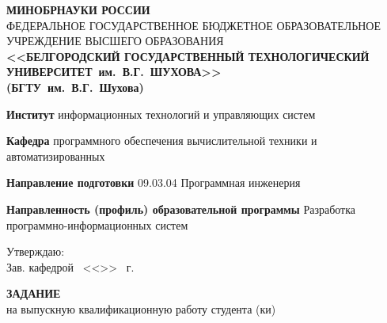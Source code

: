 \documentclass[14pt]{extarticle}
\begin{document}
\begin{center}
	\small
	\textbf{МИНОБРНАУКИ РОССИИ} \\[0.5em]
	ФЕДЕРАЛЬНОЕ ГОСУДАРСТВЕННОЕ БЮДЖЕТНОЕ ОБРАЗОВАТЕЛЬНОЕ УЧРЕЖДЕНИЕ 
	ВЫСШЕГО ОБРАЗОВАНИЯ \\[0.3em]
	\textbf{<<БЕЛГОРОДСКИЙ ГОСУДАРСТВЕННЫЙ ТЕХНОЛОГИЧЕСКИЙ\\УНИВЕРСИТЕТ~им.~В.Г.~ШУХОВА>>}\\
	\textbf{(БГТУ~им.~В.Г.~Шухова)}
\end{center}%
\begin{list}{}{\setlength{\leftmargin}{0cm}\setlength{\parsep}{1pt}}
	\small\sloppy
	\item\textbf{Институт} информационных технологий и управляющих систем
	\item\textbf{Кафедра} программного обеспечения вычислительной техники и автоматизированных 
	\item\textbf{Направление подготовки} 09.03.04 Программная инженерия
	\item\textbf{Направленность (профиль) образовательной программы} Разработка программно-информационных систем
\end{list}
\vspace{-0.5cm}
{\small\noindent
\hspace*{8.0cm}Утверждаю:\\
\hspace*{8cm}Зав. кафедрой \hrulefill \,
\hspace*{8.0cm}<<\underline{\hspace{1cm}}>> \underline{\hspace{3cm}} \the\year \ г.
}
\begin{center}
	\small
	\textbf{ЗАДАНИЕ} \\
	на выпускную квалификационную работу студента (ки) \\[0.3em]
	\noindent
	\underline{}
\end{center}
\vspace{1em}
\end{document}
